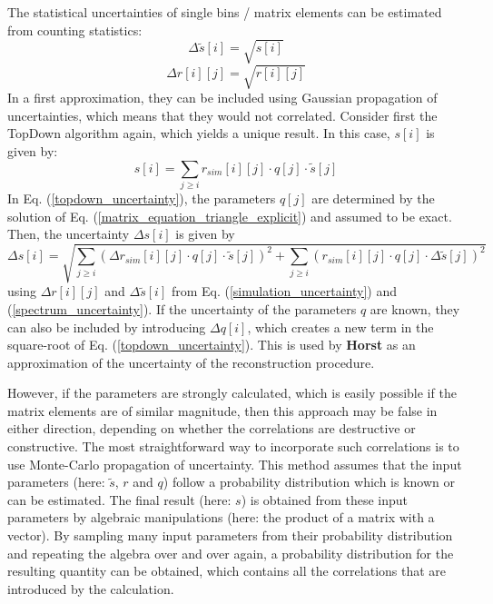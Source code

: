 \documentclass{article}
\begin{document}
The statistical uncertainties of single bins / matrix elements can be estimated from counting statistics:
%
\begin{equation}
	\label{spectrum_uncertainty}
	\Delta \tilde{s} [i] = \sqrt{ s[i] }
\end{equation}
\begin{equation}
	\label{simulation_uncertainty}
	\Delta r [i][j] = \sqrt{ r[i][j] }
\end{equation}
%
In a first approximation, they can be included using Gaussian propagation of uncertainties, which means that they would not correlated.
Consider first the TopDown algorithm again, which yields a unique result.
In this case, $s[i]$ is given by:
%
\begin{equation}
	\label{topdown_uncertainty}
	s[i] = \sum_{j \geq i} r_{sim}[i][j] \cdot q[j] \cdot \tilde{s}[j]
\end{equation}
%
In Eq. (\ref{topdown_uncertainty}), the parameters $q[j]$ are determined by the solution of Eq. (\ref{matrix_equation_triangle_explicit}) and assumed to be exact.
Then, the uncertainty $\Delta s[i]$ is given by
%
\begin{equation}
	\label{topdown_uncertainty}
	\Delta s[i] = \sqrt{\sum_{j \geq i} \left( \Delta r_{sim}[i][j] \cdot q[j] \cdot \tilde{s}[j] \right)^2 + \sum_{j \geq i} \left( r_{sim}[i][j] \cdot q[j] \cdot \Delta \tilde{s}[j] \right)^2}
\end{equation}
%
using $\Delta r[i][j]$ and $\Delta \tilde{s} [i]$ from Eq. (\ref{simulation_uncertainty}) and (\ref{spectrum_uncertainty}).
If the uncertainty of the parameters $q$ are known, they can also be included by introducing $\Delta q[i]$, which creates a new term in the square-root of Eq. (\ref{topdown_uncertainty}).
This is used by \textbf{Horst} as an approximation of the uncertainty of the reconstruction procedure.

However, if the parameters are strongly calculated, which is easily possible if the matrix elements are of similar magnitude, then this approach may be false in either direction, depending on whether the correlations are destructive or constructive.
The most straightforward way to incorporate such correlations is to use Monte-Carlo propagation of uncertainty.
This method assumes that the input parameters (here: $\tilde{s}$, $r$ and $q$) follow a probability distribution which is known or can be estimated.
The final result (here: $s$) is obtained from these input parameters by algebraic manipulations (here: the product of a matrix with a vector).
By sampling many input parameters from their probability distribution and repeating the algebra over and over again, a probability distribution for the resulting quantity can be obtained, which contains all the correlations that are introduced by the calculation.
\end{document}
